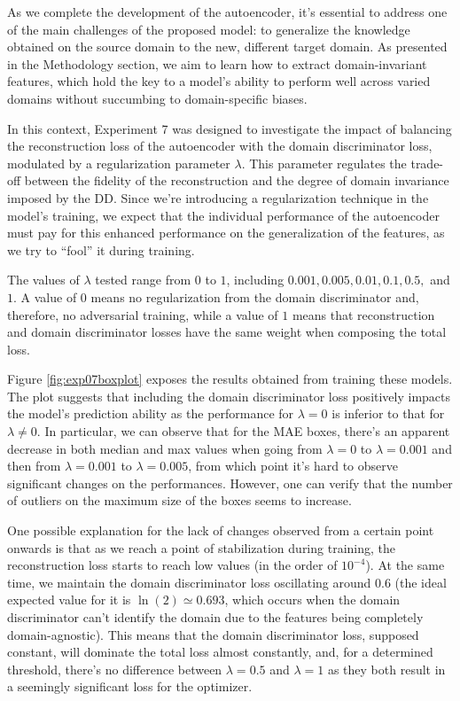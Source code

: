 As we complete the development of the autoencoder, it's essential to address one of the main challenges of the proposed model: to generalize the knowledge obtained on the source domain to the new, different target domain. As presented in the Methodology section, we aim to learn how to extract domain-invariant features, which hold the key to a model's ability to perform well across varied domains without succumbing to domain-specific biases.

In this context, Experiment 7 was designed to investigate the impact of balancing the reconstruction loss of the autoencoder with the domain discriminator loss, modulated by a regularization parameter $\lambda$. This parameter regulates the trade-off between the fidelity of the reconstruction and the degree of domain invariance imposed by the \gls{DD}. Since we're introducing a regularization technique in the model's training, we expect that the individual performance of the autoencoder must pay for this enhanced performance on the generalization of the features, as we try to ``fool'' it during training.

The values of $\lambda$ tested range from $0$ to $1$, including $0.001, 0.005, 0.01, 0.1, 0.5,$ and $1$. A value of $0$ means no regularization from the domain discriminator and, therefore, no adversarial training, while a value of $1$ means that reconstruction and domain discriminator losses have the same weight when composing the total loss.

Figure \ref{fig:exp07boxplot} exposes the results obtained from training these models. The plot suggests that including the domain discriminator loss positively impacts the model's prediction ability as the performance for $\lambda=0$ is inferior to that for $\lambda \neq 0$. In particular, we can observe that for the \gls{MAE} boxes, there's an apparent decrease in both median and max values when going from $\lambda=0$ to $\lambda=0.001$ and then from $\lambda=0.001$ to $\lambda=0.005$, from which point it's hard to observe significant changes on the performances. However, one can verify that the number of outliers on the maximum size of the boxes seems to increase.

One possible explanation for the lack of changes observed from a certain point onwards is that as we reach a point of stabilization during training, the reconstruction loss starts to reach low values (in the order of $10^{-4}$). At the same time, we maintain the domain discriminator loss oscillating around 0.6 (the ideal expected value for it is $\ln{(2)}\simeq 0.693$, which occurs when the domain discriminator can't identify the domain due to the features being completely domain-agnostic). This means that the domain discriminator loss, supposed constant, will dominate the total loss almost constantly, and, for a determined threshold, there's no difference between $\lambda=0.5$ and $\lambda=1$ as they both result in a seemingly significant loss for the optimizer.

